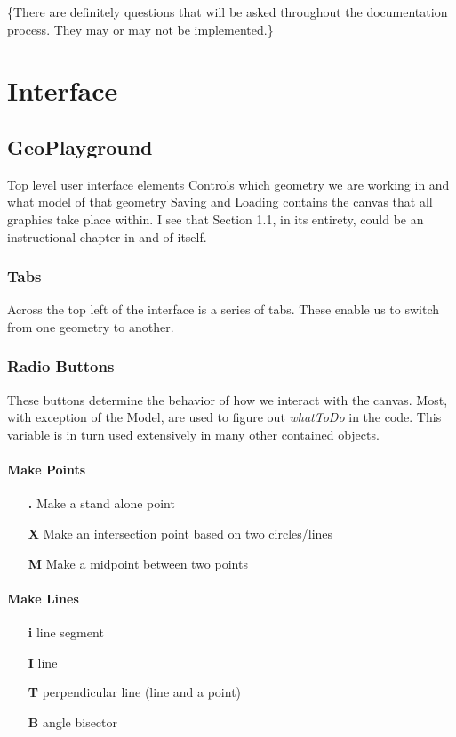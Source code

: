 \documentclass[a4paper,10pt]{report}
\title{}
\author{}
\begin{document}
\maketitle

\tableofcontents
\{There are definitely questions that will be asked throughout the documentation process.  They may or may not be implemented.\}
\chapter{Interface}
\section{GeoPlayground}
  Top level user interface elements
  Controls which geometry we are working in and what model of that geometry
  Saving and Loading
  contains the canvas that all graphics take place within.  I see that Section 1.1, in its entirety, could be an instructional chapter in and of itself.
\subsection{Tabs}
  Across the top left of the interface is a series of tabs.  These enable us to switch from one geometry to another.  

\subsection{Radio Buttons}
These buttons determine the behavior of how we interact with the canvas.  Most, with exception of the Model, are used to figure out {\it whatToDo} in the code.  This variable is in turn used extensively in many other contained objects.
\subsubsection{Make Points}
\begin{enumerate}
 \item[\bf .] Make a stand alone point
 \item[\bf X] Make an intersection point based on two circles/lines
 \item[\bf M] Make a midpoint between two points
\end{enumerate}
\subsubsection{Make Lines}
\begin{enumerate}
 \item[\bf i] line segment
 \item[\bf I] line
\item[\bf T] perpendicular line (line and a point)
\item[\bf B] angle bisector
\end{enumerate}
\end{document}
